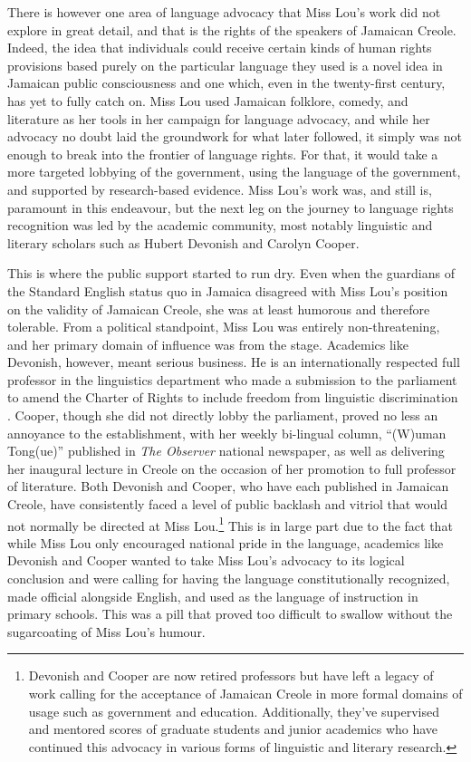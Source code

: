 \documentclass[output=paper,colorlinks,citecolor=brown]{langscibook}
\begin{document}
There is however one area of language advocacy that Miss Lou’s work did not explore in great detail, and that is the rights of the speakers of Jamaican Creole. Indeed, the idea that individuals could receive certain kinds of human rights provisions based purely on the particular language they used is a novel idea in Jamaican public consciousness and one which, even in the twenty-first century, has yet to fully catch on. Miss Lou used Jamaican folklore, comedy, and literature as her tools in her campaign for language advocacy, and while her advocacy no doubt laid the groundwork for what later followed, it simply was not enough to break into the frontier of language rights. For that, it would take a more targeted lobbying of the government, using the language of the government, and supported by research-based evidence. Miss Lou’s work was, and still is, paramount in this endeavour, but the next leg on the journey to language rights recognition was led by the academic community, most notably linguistic and literary scholars such as Hubert Devonish and Carolyn Cooper. 

This is where the public support started to run dry. Even when the guardians of the Standard English status quo in Jamaica disagreed with Miss Lou’s position on the validity of Jamaican Creole, she was at least humorous and therefore tolerable. From a political standpoint, Miss Lou was entirely non-threatening, and her primary domain of influence was from the stage. Academics like Devonish, however, meant serious business. He is an internationally respected full professor in the linguistics department who made a submission to the parliament to amend the Charter of Rights to include freedom from linguistic discrimination \citep{JamaicanLanguageUnit2011}. Cooper, though she did not directly lobby the parliament, proved no less an annoyance to the establishment, with her weekly bi-lingual column, “(W)uman Tong(ue)” published in \textit{The Observer} national newspaper, as well as delivering her inaugural lecture in Creole on the occasion of her promotion to full professor of literature. Both Devonish and Cooper, who have each published in Jamaican Creole, have consistently faced a level of public backlash and vitriol that would not normally be directed at Miss Lou.\footnote{Devonish and Cooper are now retired professors but have left a legacy of work calling for the acceptance of Jamaican Creole in more formal domains of usage such as government and education. Additionally, they’ve supervised and mentored scores of graduate students and junior academics who have continued this advocacy in various forms of linguistic and literary research.} This is in large part due to the fact that while Miss Lou only encouraged national pride in the language, academics like Devonish and Cooper wanted to take Miss Lou’s advocacy to its logical conclusion and were calling for having the language constitutionally recognized, made official alongside English, and used as the language of instruction in primary schools. This was a pill that proved too difficult to swallow without the sugarcoating of Miss Lou’s humour. 
\end{document}
